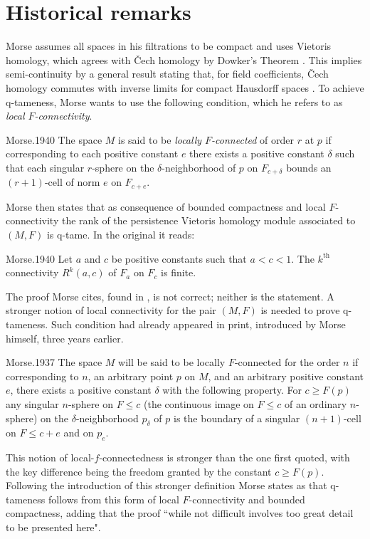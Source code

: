 
\section{Historical remarks}

Morse assumes all spaces in his filtrations to be compact and uses Vietoris homology, which agrees with \v{C}ech homology by Dowker's Theorem \cite{Dowker.1952}. This implies semi-continuity by a general result stating that, for field coefficients, \v{C}ech homology commutes with inverse limits for compact Hausdorff spaces \cite[Theorem VIII.3.6 and Theorem X.3.1]{MR0050886}. To achieve q-tameness, Morse wants to use the following condition, which he refers to as \textit{local $F$-connectivity}. 
\begin{displaycquote}[p.431]{Morse.1940}
	The space $M$ is said to be \textit{locally $F$-connected} of order $r$ at $p$ if corresponding to each positive constant $e$ there exists a positive constant $\delta$ such that each singular $r$-sphere on the $\delta$-neighborhood of $p$ on $F_{c+\delta}$ bounds an $(r+1)$-cell of norm $e$ on $F_{c+e}$.
\end{displaycquote}
Morse then states that as consequence of bounded compactness and local $F$-connectivity the rank of the persistence Vietoris homology module associated to $(M, F)$ is q-tame.
In the original it reads:
\begin{displaycquote}[Theorem 6.3, p.432]{Morse.1940}
	Let $a$ and $c$ be positive constants such that $a < c < 1$.
	The $k^{\mathrm{th}}$ connectivity $R^k(a,c)$ of $F_a$ on $F_c$ is finite.
\end{displaycquote}
The proof Morse cites, found in \cite[Theorem 6.1]{Morse.1938}, is not correct; neither is the statement.
A stronger notion of local connectivity for the pair $(M, F)$ is needed to prove q-tameness.
Such condition had already appeared in print, introduced by Morse himself, three years earlier.
\begin{displaycquote}[p.421-422]{Morse.1937}
	The space $M$ will be said to be locally $F$-connected for the order $n$ if corresponding to $n$, an arbitrary point $p$ on $M$, and an arbitrary positive constant $e$, there exists a positive constant $\delta$ with the following property. For $c \geq F(p)$ any singular $n$-sphere on $F \leq c$ (the continuous image on $F \leq c$ of an ordinary $n$-sphere) on the $\delta$-neighborhood $p_{\delta}$ of $p$ is the boundary of a singular $(n + 1)$-cell on $F \leq c + e$ and on $p_e$.
\end{displaycquote}
This notion of local-$f$-connectedness is stronger than the one first quoted, with the key difference being the freedom granted by the constant $c \geq F(p)$.
Following the introduction of this stronger definition Morse states as \cite[Theorem~9.2, p.422]{Morse.1937} that q-tameness follows from this form of local $F$-connectivity and bounded compactness, adding that the proof ``while not difficult involves too great detail to be presented here".

